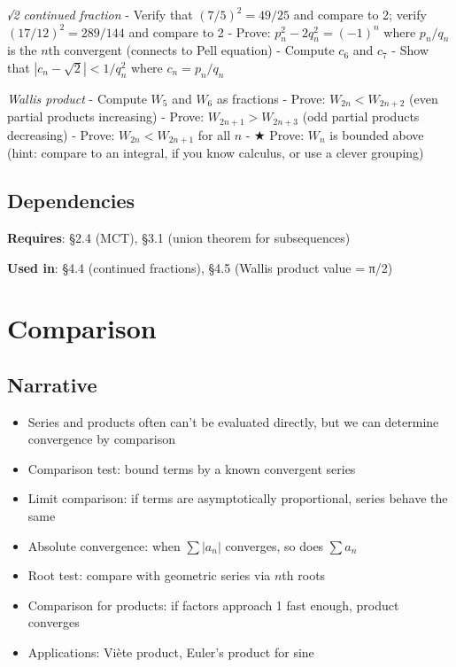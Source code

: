 \documentclass[
  10pt,
  letterpaper,
]{scrbook}
\providecommand{\tightlist}{%
  \setlength{\itemsep}{0pt}\setlength{\parskip}{0pt}}
\begin{document}
\emph{√2 continued fraction} - Verify that \((7/5)^2 = 49/25\) and
compare to 2; verify \((17/12)^2 = 289/144\) and compare to 2 - Prove:
\(p_n^2 - 2q_n^2 = (-1)^n\) where \(p_n/q_n\) is the \(n\)th convergent
(connects to Pell equation) - Compute \(c_6\) and \(c_7\) - Show that
\(|c_n - \sqrt{2}| < 1/q_n^2\) where \(c_n = p_n/q_n\)

\emph{Wallis product} - Compute \(W_5\) and \(W_6\) as fractions -
Prove: \(W_{2n} < W_{2n+2}\) (even partial products increasing) - Prove:
\(W_{2n+1} > W_{2n+3}\) (odd partial products decreasing) - Prove:
\(W_{2n} < W_{2n+1}\) for all \(n\) - ★ Prove: \(W_n\) is bounded above
(hint: compare to an integral, if you know calculus, or use a clever
grouping)

\subsection{Dependencies}\label{dependencies-15}

\textbf{Requires}: §2.4 (MCT), §3.1 (union theorem for subsequences)

\textbf{Used in}: §4.4 (continued fractions), §4.5 (Wallis product value
= π/2)

\section{Comparison}\label{comparison}

\subsection{Narrative}\label{narrative-16}

\begin{itemize}
\tightlist
\item
  Series and products often can't be evaluated directly, but we can
  determine convergence by comparison
\item
  Comparison test: bound terms by a known convergent series
\item
  Limit comparison: if terms are asymptotically proportional, series
  behave the same
\item
  Absolute convergence: when \(\sum |a_n|\) converges, so does
  \(\sum a_n\)
\item
  Root test: compare with geometric series via \(n\)th roots
\item
  Comparison for products: if factors approach 1 fast enough, product
  converges
\item
  Applications: Viète product, Euler's product for sine
\end{itemize}
\end{document}
